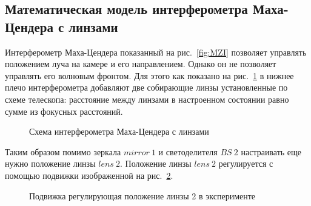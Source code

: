 \subsection{Математическая модель интерферометра Маха-Цендера с линзами}\label{sec:ch2/sec1/subsec4}

Интерферометр Маха-Цендера показанный на рис.~\ref{fig:MZI} позволяет управлять положением луча на камере и его направлением. Однако он не позволяет управлять его волновым фронтом. Для этого как показано на рис.~\ref{fig:MZI_expl_lenses} в нижнее плечо интерферометра добавляют две собирающие линзы установленные по схеме телескопа: расстояние между линзами в настроенном состоянии равно сумме из фокусных расстояний. 

\begin{figure}[ht]
\caption{Схема интерферометра Маха-Цендера с линзами}
\label{fig:MZI_expl_lenses}
\end{figure}

Таким образом помимо зеркала $mirror\ 1$ и светоделителя $BS\ 2$ настраивать еще нужно положение линзы $lens\ 2$. Положение линзы $lens\ 2$ регулируется с помощью подвижки изображенной на рис.~\ref{fig:lense_mount}. 

\begin{figure}[ht]
\caption{Подвижка регулирующая положение линзы 2 в эксперименте \cite{standa_stage}}
\label{fig:lense_mount}
\end{figure}


